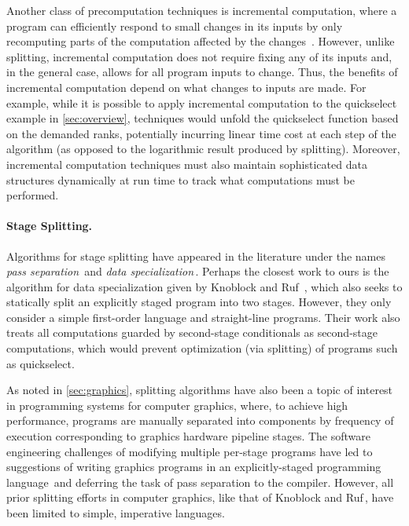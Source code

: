 Another class of precomputation techniques is incremental computation,
where a program can efficiently respond to small changes in its inputs
by only recomputing parts of the computation affected by the
changes~\cite{DemersReTe81,PughTe89,RamalingamRe93,AcarBlBlHaTa09}.
However, unlike splitting, incremental computation does not require
fixing any of its inputs and, in the general case, allows for all
program inputs to change. Thus, the benefits of incremental
computation depend on what changes to inputs are made. For example,
while it is possible to apply incremental computation to the
quickselect example in \ref{sec:overview}, techniques would unfold the
quickselect function based on the demanded ranks, potentially
incurring linear time cost at each step of the algorithm (as opposed
to the logarithmic result produced by splitting).  Moreover,
incremental computation techniques must also maintain sophisticated
data structures dynamically at run time to track what computations
must be performed.

\paragraph{Stage Splitting.}

Algorithms for stage splitting have appeared in the literature under
the names {\em pass separation}\,\cite{JS86-staging} and {\em data
  specialization}\,\cite{knoblock96}.  Perhaps the closest work to
ours is the algorithm for data specialization given by Knoblock and
Ruf~\cite{knoblock96}, which also seeks to statically split an
explicitly staged program into two stages.  However, they only
consider a simple first-order language and straight-line
programs. Their work also treats all computations guarded by
second-stage conditionals as second-stage computations, which would
prevent optimization (via splitting) of programs such as quickselect.

As noted in \ref{sec:graphics}, splitting algorithms have also been a
topic of interest in programming systems for computer graphics, where,
to achieve high performance, programs are manually separated into
components by frequency of execution corresponding to graphics
hardware pipeline stages. The software engineering challenges of
modifying multiple per-stage programs have led to suggestions of
writing graphics programs in an explicitly-staged programming
language\,\cite{Proudfoot:2001,Foley:2011,He:2014} and deferring the
task of pass separation to the compiler. However, all prior splitting
efforts in computer graphics, like that of Knoblock and
Ruf\,\cite{knoblock96}, have been limited to simple, imperative
languages.

